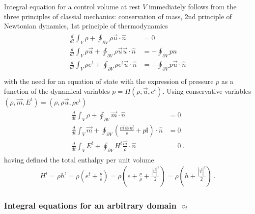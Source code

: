 \documentclass[letterpaper,10pt,english]{jupyterBook}
\begin{document}
\sphinxAtStartPar
Integral equation for a control volume at rest \(V\) immediately follows from the three principles of classial mechanics: conservation of mass, 2\sphinxhyphen{}nd principle of Newtonian dynamics, 1\sphinxhyphen{}st principle of thermodynamics
\begin{equation*}
\begin{split}\begin{aligned}
  \frac{d}{dt} \int_{V} \rho         + \oint_{\partial V} \rho         \vec{u} \cdot \hat{n} & = 0 \\
  \frac{d}{dt} \int_{V} \rho \vec{u} + \oint_{\partial V} \rho \vec{u} \vec{u} \cdot \hat{n} & = - \oint_{\partial V} p \hat{n} \\
  \frac{d}{dt} \int_{V} \rho e^t     + \oint_{\partial V} \rho e^t     \vec{u} \cdot \hat{n} & = - \oint_{\partial V} p \vec{u} \cdot \hat{n} \\
\end{aligned}\end{split}
\end{equation*}
\sphinxAtStartPar
with the need for an equation of state with the expression of pressure \(p\) as a function of the dynamical variables \(p = \Pi(\rho, \vec{u}, e^t)\). Using conservative variables \((\rho, \vec{m}, E^t) = (\rho, \rho \vec{u}, \rho e^t)\)
\begin{equation*}
\begin{split}\begin{aligned}
  \frac{d}{dt} \int_{V} \rho    + \oint_{\partial V} \vec{m} \cdot \hat{n} & = 0 \\
  \frac{d}{dt} \int_{V} \vec{m} + \oint_{\partial V} \left( \frac{\vec{m} \otimes \vec{m}}{\rho} + p \mathbb{I} \right) \cdot \hat{n} & = 0 \\
  \frac{d}{dt} \int_{V} E^t     + \oint_{\partial V} H^t \frac{\vec{m}}{\rho} \cdot \hat{n} & = 0 \ .
\end{aligned}\end{split}
\end{equation*}
\sphinxAtStartPar
having defined the total enthalpy per unit volume
\begin{equation*}
\begin{split}H^t = \rho h^t = \rho \left( e^t + \frac{p}{\rho} \right) = \rho \left( e + \frac{p}{\rho} + \frac{|\vec{u}|^2}{2} \right) = \rho \left( h + \frac{|\vec{v}|^2}{2} \right) \ .\end{split}
\end{equation*}\subsubsection*{Integral equations for an arbitrary domain \protect\(\ v_t \ \protect\)}
\end{document}
